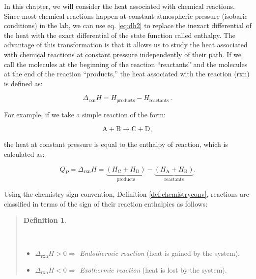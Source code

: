 \documentclass[
  9pt,
]{extbook}
\providecommand{\tightlist}{%
  \setlength{\itemsep}{0pt}\setlength{\parskip}{0pt}}
\theoremstyle{definition}
\newtheorem{definition}{Definition}[chapter]
\theoremstyle{definition}
\theoremstyle{definition}
\theoremstyle{definition}
\theoremstyle{remark}
\begin{document}
In this chapter, we will consider the heat associated with chemical reactions. Since most chemical reactions happen at constant atmospheric pressure (isobaric conditions) in the lab, we can use eq. \eqref{eq:dh2} to replace the inexact differential of the heat with the exact differential of the state function called enthalpy. The advantage of this transformation is that it allows us to study the heat associated with chemical reactions at constant pressure independently of their path. If we call the molecules at the beginning of the reaction ``reactants'' and the molecules at the end of the reaction ``products,'' the heat associated with the reaction (rxn) is defined as:

\begin{equation}
  \Delta_{\text{rxn}} H = H_{\text{products}}-H_{\text{reactants}} \; .
  \label{eq:DHrxn1}
\end{equation}

For example, if we take a simple reaction of the form:

\[\mathrm{A} + \mathrm{B} \rightarrow \mathrm{C} + \mathrm{D},\]

the heat at constant pressure is equal to the enthalpy of reaction, which is calculated as:

\begin{equation}
  Q_P = \Delta_{\text{rxn}} H = \underbrace{ \left (H_{\mathrm{C}}+H_{\mathrm{D}} \right) }_{\text{products}} - \underbrace{\left( H_{\mathrm{A}}+H_{\mathrm{B}}\right)}_{\text{reactants}}.
  \label{eq:DHrxn2}
\end{equation}

Using the chemistry sign convention, Definition \ref{def:chemistryconv}, reactions are classified in terms of the sign of their reaction enthalpies as follows:

\begin{quote}
\begin{definition}
\protect\hypertarget{def:exoendo}{}\label{def:exoendo}

\(\;\)

\begin{itemize}
\tightlist
\item
  \(\Delta_{\text{rxn}} H > 0 \Rightarrow\) \emph{Endothermic reaction} (heat is gained by the system).
\item
  \(\Delta_{\text{rxn}} H < 0 \Rightarrow\) \emph{Exothermic reaction} (heat is lost by the system).
\end{itemize}

\end{definition}
\end{quote}
\end{document}
